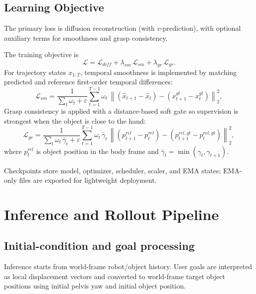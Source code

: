 \subsection{Learning Objective}

The primary loss is diffusion reconstruction (with $v$-prediction), with optional auxiliary terms for smoothness and grasp consistency. 

The training objective is
\begin{equation}
\mathcal{L} = \mathcal{L}_{diff} + \lambda_{sm}\,\mathcal{L}_{sm} + \lambda_{gr}\,\mathcal{L}_{gr}.
\label{eq:total_loss_exp}
\end{equation}
For trajectory states $x_{1:T}$, temporal smoothness is implemented by matching predicted and reference first-order temporal differences:
\begin{equation}
\mathcal{L}_{sm} = \frac{1}{\sum_t \omega_t + \varepsilon}
\sum_{t=1}^{T-1} \omega_t\,
\left\| (\hat x_{t+1}-\hat x_t) - (x^{gt}_{t+1}-x^{gt}_t) \right\|_2^2,
\label{eq:smoothness_loss_exp}
\end{equation}
Grasp consistency is applied with a distance-based soft gate so supervision is strongest when the object is close to the hand:
\begin{equation}
\mathcal{L}_{gr} = \frac{1}{\sum_t\omega_t\,\bar\gamma_t+\varepsilon}
\sum_{t=1}^{T-1}\omega_t\,\bar\gamma_t\,
\left\| (p_{t+1}^{rel}-p_t^{rel})-(p_{t+1}^{rel,gt}-p_t^{rel,gt}) \right\|_2^2,
\label{eq:grasp_loss_exp}
\end{equation}
where $p_t^{rel}$ is object position in the body frame and $\bar\gamma_t = \min(\gamma_t,\gamma_{t+1})$.

Checkpoints store model, optimizer, scheduler, scaler, and EMA states; EMA-only files are exported for lightweight deployment.

\section{Inference and Rollout Pipeline}

\subsection{Initial-condition and goal processing}

Inference starts from world-frame robot/object history. User goals are interpreted as local displacement vectors and converted to world-frame target object positions using initial pelvis yaw and initial object position.

